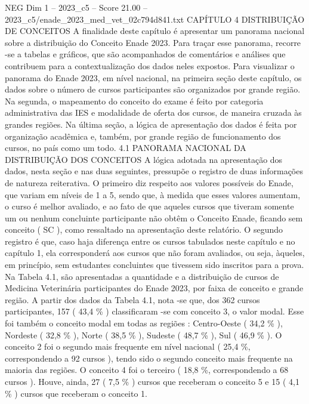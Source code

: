 \begin{textsample}{NEG Dim 1 – 2023\_c5 – Score 21.00 – 2023\_c5/enade\_2023\_med\_vet\_02c794d841.txt}  \label{ex:f1_neg_430}
CAPÍTULO 4 DISTRIBUIÇÃO DE CONCEITOS A finalidade deste capítulo é apresentar um panorama nacional sobre a distribuição do Conceito Enade 2023.
Para traçar esse panorama, recorre -se a tabelas e gráficos, que são acompanhados de comentários e análises que contribuem para a contextualização dos dados neles expostos.
Para visualizar o panorama do Enade 2023, em nível nacional, na primeira seção deste capítulo, os dados sobre o número de cursos participantes são organizados por grande região.
Na segunda, o mapeamento do conceito do exame é feito por categoria administrativa das IES e modalidade de oferta dos cursos, de maneira cruzada às grandes regiões.
Na última seção, a lógica de apresentação dos dados é feita por organização acadêmica e, também, por grande região de funcionamento dos cursos, no país como um todo. 4.1 PANORAMA NACIONAL DA DISTRIBUIÇÃO DOS CONCEITOS A lógica adotada na apresentação dos dados, nesta seção e nas duas seguintes, pressupõe o registro de duas informações de natureza reiterativa.
O primeiro diz respeito aos valores possíveis do Enade, que variam em níveis de 1 a 5, sendo que, à medida que esses valores aumentam, o curso é melhor avaliado, e ao fato de que aqueles cursos que tiveram somente um ou nenhum concluinte participante não obtêm o Conceito Enade, ficando sem conceito ( SC ), como ressaltado na apresentação deste relatório.
O segundo registro é que, caso haja diferença entre os cursos tabulados neste capítulo e no capítulo 1, ela corresponderá aos cursos que não foram avaliados, ou seja, àqueles, em princípio, sem estudantes concluintes que tivessem sido inscritos para a prova.
Na Tabela 4.1, são apresentadas a quantidade e a distribuição de cursos de Medicina Veterinária participantes do Enade 2023, por faixa de conceito e grande região.
A partir dos dados da Tabela 4.1, nota -se que, dos 362 cursos participantes, 157 ( 43,4 \% ) classificaram -se com conceito 3, o valor modal.
Esse foi também o conceito modal em todas as regiões : Centro-Oeste ( 34,2 \% ), Nordeste ( 32,8 \% ), Norte ( 38,5 \% ), Sudeste ( 48,7 \% ), Sul ( 46,9 \% ).
O conceito 2 foi o segundo mais frequente em nível nacional ( 25,4 \%, correspondendo a 92 cursos ), tendo sido o segundo conceito mais frequente na maioria das regiões.
O conceito 4 foi o terceiro ( 18,8 \%, correspondendo a 68 cursos ).
Houve, ainda, 27 ( 7,5 \% ) cursos que receberam o conceito 5 e 15 ( 4,1 \% ) cursos que receberam o conceito 1.

\end{textsample}
